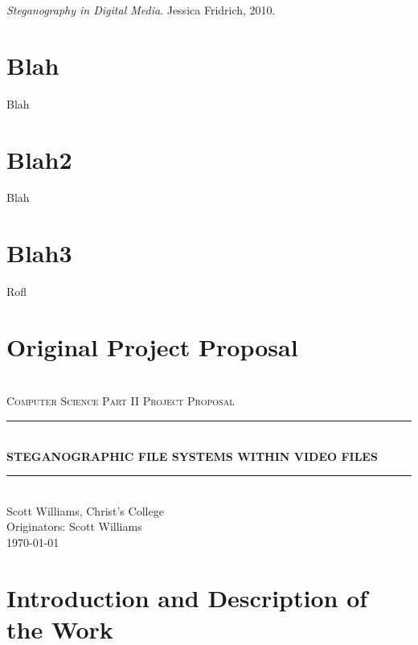\documentclass[paper=a4, fontsize=11pt,twoside]{scrartcl}    %
\makeatletter
\numberwithin{table}{section}
\numberwithin{figure}{section}
\numberwithin{algorithm}{section}
\newcommand{\HRule}[1]{\rule{\linewidth}{#1}}
\def\printauthor{%
    {\large \@author}}
\makeatother
\begin{document}
\vfill

\pagebreak

\begin{thebibliography}{1}

  \emph{Steganography in Digital Media}.
  Jessica Fridrich, 2010.

\end{thebibliography}

\pagebreak

\appendix
\section{Blah} 
\label{app:a}

Blah

\section{Blah2} 
\label{app:b}

Blah

\section{Blah3} 
\label{app:c}

Rofl

\vfill

\section{Original Project Proposal} 

\begin{center}	
 	~\\[2.0cm]			
	\normalsize \textsc{Computer Science Part II Project Proposal}\\[2.0cm]     
    \HRule{0.5pt} \\                        
    \LARGE \textbf{\uppercase{Steganographic file systems within video files}}    
    \HRule{2pt} \\[30pt]        
    \normalsize Scott Williams, Christ's College\\[2pt]Originators: Scott Williams\\[25pt]           
    \normalsize \today            
     \vfill
\end{center}
\printauthor                
\newpage
\section*{Introduction and Description of the Work}
\end{document}
